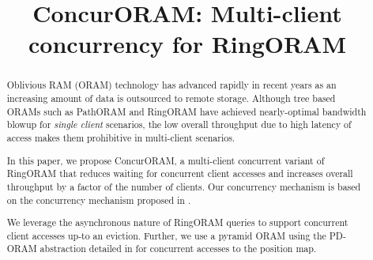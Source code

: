 \documentclass{acm}
\title{ConcurORAM: Multi-client concurrency for RingORAM}
\begin{document}
\maketitle
\begin{abstract}
 Oblivious RAM (ORAM) technology has advanced rapidly in recent years as 
 an increasing amount of data is outsourced to remote storage. Although 
 tree based ORAMs such as PathORAM and RingORAM have achieved nearly-optimal 
 bandwidth blowup for {\em single client} scenarios, the low overall 
 throughput due to high latency of access 
 makes them prohibitive in multi-client scenarios.
 
 In this paper, we propose ConcurORAM, a multi-client concurrent variant 
 of RingORAM that reduces waiting for concurrent client accesses and 
 increases overall throughput by a factor of the number of clients.
 Our concurrency mechanism is based on the concurrency mechanism 
 proposed in \cite{privatefs}. 
 
 We leverage the asynchronous nature of RingORAM queries to 
 support concurrent client accesses up-to an eviction. Further, we 
 use a pyramid ORAM using the PD-ORAM abstraction detailed in \cite{privatefs} 
 for concurrent accesses to the position map.
 
\end{abstract}









\end{document}
